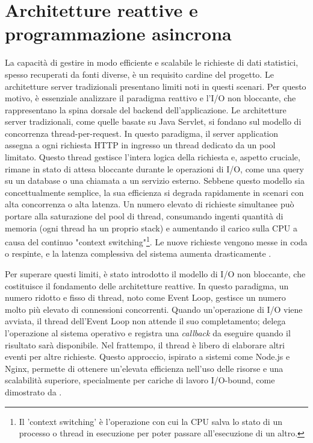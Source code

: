 \documentclass[12pt,a4paper,openright,twoside]{book}
\begin{document}
\section{Architetture reattive e programmazione asincrona}

La capacità di gestire in modo efficiente e scalabile le richieste di dati statistici, spesso recuperati da fonti diverse, è un requisito cardine del progetto. Le architetture server tradizionali presentano limiti noti in questi scenari. Per questo motivo, è essenziale analizzare il paradigma reattivo e l'I/O non bloccante, che rappresentano la spina dorsale del backend dell'applicazione.
Le architetture server tradizionali, come quelle basate su Java Servlet, si fondano sul modello di concorrenza thread-per-request. In questo paradigma, il server application assegna a ogni richiesta HTTP in ingresso un thread dedicato da un pool limitato. Questo thread gestisce l'intera logica della richiesta e, aspetto cruciale, rimane in stato di attesa bloccante durante le operazioni di I/O, come una query su un database o una chiamata a un servizio esterno. Sebbene questo modello sia concettualmente semplice, la sua efficienza si degrada rapidamente in scenari con alta concorrenza o alta latenza. Un numero elevato di richieste simultanee può portare alla saturazione del pool di thread, consumando ingenti quantità di memoria (ogni thread ha un proprio stack) e aumentando il carico sulla CPU a causa del continuo "context switching"\footnote{Il 'context switching' è l'operazione con cui la CPU salva lo stato di un processo o thread in esecuzione per poter passare all'esecuzione di un altro.}. Le nuove richieste vengono messe in coda o respinte, e la latenza complessiva del sistema aumenta drasticamente \cite{vrincean2021optimizing}.

Per superare questi limiti, è stato introdotto il modello di I/O non bloccante, che costituisce il fondamento delle architetture reattive. In questo paradigma, un numero ridotto e fisso di thread, noto come Event Loop, gestisce un numero molto più elevato di connessioni concorrenti. Quando un'operazione di I/O viene avviata, il thread dell'Event Loop non attende il suo completamento; delega l'operazione al sistema operativo e registra una \textit{callback} da eseguire quando il risultato sarà disponibile. Nel frattempo, il thread è libero di elaborare altri eventi per altre richieste. Questo approccio, ispirato a sistemi come Node.js e Nginx, permette di ottenere un'elevata efficienza nell'uso delle risorse e una scalabilità superiore, specialmente per cariche di lavoro I/O-bound, come dimostrato da \cite{derezinska2020performance}.
\end{document}
